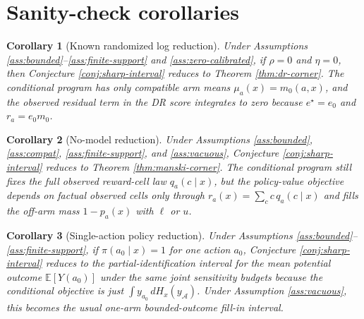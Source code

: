 \documentclass[11pt]{article}
\newcommand{\E}{\mathbb{E}}
\theoremstyle{definition}
\theoremstyle{plain}
\newtheorem{corollary}{Corollary}
\theoremstyle{remark}
\begin{document}
\section{Sanity-check corollaries}
\begin{corollary}[Known randomized log reduction]
Under Assumptions \ref{ass:bounded}--\ref{ass:finite-support} and \ref{ass:zero-calibrated}, if $\rho=0$ and $\eta=0$, then Conjecture \ref{conj:sharp-interval} reduces to Theorem \ref{thm:dr-corner}. The conditional program has only compatible arm means $\mu_a(x)=m_0(a,x)$, and the observed residual term in the DR score integrates to zero because $e^\star=e_0$ and $r_a=e_0m_0$.
\end{corollary}

\begin{corollary}[No-model reduction]
Under Assumptions \ref{ass:bounded}, \ref{ass:compat}, \ref{ass:finite-support}, and \ref{ass:vacuous}, Conjecture \ref{conj:sharp-interval} reduces to Theorem \ref{thm:manski-corner}. The conditional program still fixes the full observed reward-cell law $q_a(c\mid x)$, but the policy-value objective depends on factual observed cells only through $r_a(x)=\sum_c c\,q_a(c\mid x)$ and fills the off-arm mass $1-p_a(x)$ with $\ell$ or $u$.
\end{corollary}

\begin{corollary}[Single-action policy reduction]
Under Assumptions \ref{ass:bounded}--\ref{ass:finite-support}, if $\pi(a_0\mid x)=1$ for one action $a_0$, Conjecture \ref{conj:sharp-interval} reduces to the partial-identification interval for the mean potential outcome $\E[Y(a_0)]$ under the same joint sensitivity budgets because the conditional objective is just $\int y_{a_0}\,dH_x(y_{\mathcal A})$. Under Assumption \ref{ass:vacuous}, this becomes the usual one-arm bounded-outcome fill-in interval.
\end{corollary}
\end{document}
